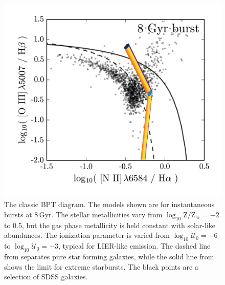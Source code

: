 \documentclass[preprint2]{aastex62}
\newcommand{\logten}{\ensuremath{\log_{10}}}
\newcommand{\logZeq}[1]{\ensuremath{\logten \mathrm{Z}/\mathrm{Z}_{\sun} = #1}}
\newcommand{\logUeq}[1]{\ensuremath{\logten \mathcal{U}_0 = #1}}
\newcommand{\Gyr}{$\,$Gyr\xspace}
\begin{document}
\begin{figure}
  \begin{center}
    \includegraphics[width=\linewidth]{figs/f6.png}
    \caption{The classic BPT diagram. The models shown are for instantaneous bursts at 8\Gyr. The stellar metallicities vary from \logZeq{-2} to 0.5, but the gas phase metallicity is held constant with solar-like abundances. The ionization parameter is varied from \logUeq{-6} to \logUeq{-3}, typical for LIER-like emission. The dashed line from \citet{Kauffmann+2003b} separates pure star forming galaxies, while the solid line from \citet{Kewley+2001} shows the limit for extreme starbursts. The black points are a selection of SDSS galaxies.}
    \label{fig:BPT1}
  \end{center}
\end{figure}
\end{document}
